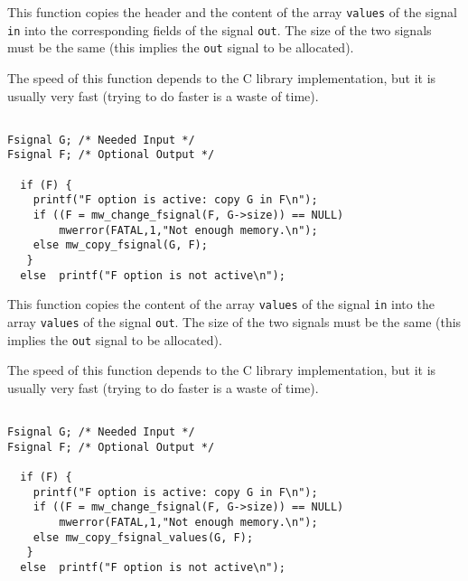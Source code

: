 \newpage %

\Description
This function copies the header and the content of the array \verb+values+ of the signal \verb+in+ into the corresponding fields of the signal \verb+out+.
The size of the two signals must be the same (this implies the \verb+out+ signal to
be allocated).

The speed of this function depends to the C library implementation, but it is
usually very fast (trying to do faster is a waste of time).

\Next
\Example
\begin{verbatim}

Fsignal G; /* Needed Input */
Fsignal F; /* Optional Output */

  if (F) {
    printf("F option is active: copy G in F\n");
    if ((F = mw_change_fsignal(F, G->size)) == NULL)
        mwerror(FATAL,1,"Not enough memory.\n");
    else mw_copy_fsignal(G, F);
   }
  else  printf("F option is not active\n");
\end{verbatim}

\newpage %

\Description
This function copies the content of the array \verb+values+ of the signal \verb+in+ into the array \verb+values+ of the signal \verb+out+.
The size of the two signals must be the same (this implies the \verb+out+ signal to
be allocated).

The speed of this function depends to the C library implementation, but it is
usually very fast (trying to do faster is a waste of time).

\Next
\Example
\begin{verbatim}

Fsignal G; /* Needed Input */
Fsignal F; /* Optional Output */

  if (F) {
    printf("F option is active: copy G in F\n");
    if ((F = mw_change_fsignal(F, G->size)) == NULL)
        mwerror(FATAL,1,"Not enough memory.\n");
    else mw_copy_fsignal_values(G, F);
   }
  else  printf("F option is not active\n");
\end{verbatim}

